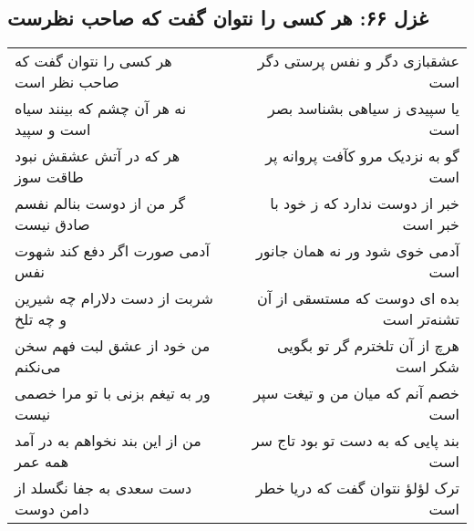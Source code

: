 \begin{center}
\section*{غزل ۶۶: هر کسی را نتوان گفت که صاحب نظرست}
\label{sec:066}
\begin{longtable}{l p{0.5cm} r}
هر کسی را نتوان گفت که صاحب نظر است
&&
عشقبازی دگر و نفس پرستی دگر است
\\
نه هر آن چشم که بینند سیاه است و سپید
&&
یا سپیدی ز سیاهی بشناسد بصر است
\\
هر که در آتش عشقش نبود طاقت سوز
&&
گو به نزدیک مرو کآفت پروانه پر است
\\
گر من از دوست بنالم نفسم صادق نیست
&&
خبر از دوست ندارد که ز خود با خبر است
\\
آدمی صورت اگر دفع کند شهوت نفس
&&
آدمی خوی شود ور نه همان جانور است
\\
شربت از دست دلارام چه شیرین و چه تلخ
&&
بده ای دوست که مستسقی از آن تشنه‌تر است
\\
من خود از عشق لبت فهم سخن می‌نکنم
&&
هرچ از آن تلخترم گر تو بگویی شکر است
\\
ور به تیغم بزنی با تو مرا خصمی نیست
&&
خصم آنم که میان من و تیغت سپر است
\\
من از این بند نخواهم به در آمد همه عمر
&&
بند پایی که به دست تو بود تاج سر است
\\
دست سعدی به جفا نگسلد از دامن دوست
&&
ترک لؤلؤ نتوان گفت که دریا خطر است
\\
\end{longtable}
\end{center}
